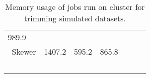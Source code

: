 \begin{table}[ht]
\begin{tabular}{lr|rr|rr|r}
            
            989.9 &
            
            \\\            Skewer &
            
            1407.2 &
            
            
            595.2 &
            
            
            865.8
            
            \\\
        
        \end{tabular}
\caption{Memory usage of jobs run on cluster for trimming simulated datasets.\label{tab:memory}}
\end{table}

